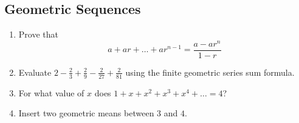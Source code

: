 \documentclass{article}
\begin{document}
    \subsection*{Geometric Sequences}
    \begin{enumerate}[resume]
        \item Prove that
        \[a + ar + \dots + ar^{n - 1} = \frac{a - ar^n}{1 - r}\]
        \vspace{3cm}
        \item Evaluate $2 - \frac{2}{3} + \frac{2}{9} - \frac{2}{27} +
        \frac{2}{81}$ using the finite geometric series sum formula.
        \vspace{3cm}
        \item For what value of $x$ does $1 + x + x^2 + x^3 + x^4 + \dots = 4$?
        \vspace{3cm}
        \item Insert two geometric means between $3$ and $4$.
        \vspace{3cm}
    \end{enumerate}
\end{document}

